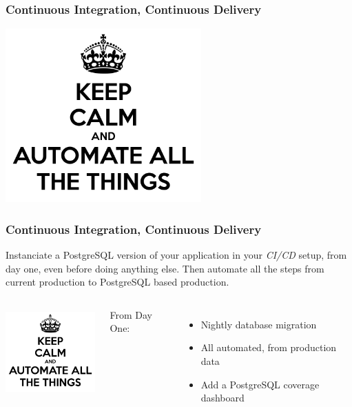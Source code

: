 \documentclass[xcolor=dvipsnames]{beamer}
\begin{document}
\begin{frame}[fragile]
  \frametitle{Continuous Integration, Continuous Delivery}

  \begin{center}
    \includegraphics[height=18em]{keep-calm-and-automate-all-the-things-13.png}
  \end{center}  
\end{frame}

\begin{frame}[fragile]
  \frametitle{Continuous Integration, Continuous Delivery}

  Instanciate a PostgreSQL version of your application in your
  \textit{CI/CD} setup, from day one, even before doing anything else. Then
  automate all the steps from current production to PostgreSQL based
  production.

  \vfill
  
  \begin{columns}[c]
    \begin{center}
      \includegraphics[height=9em]{keep-calm-and-automate-all-the-things-13.png}
    \end{center}

    From Day One:
    \begin{itemize}
    \item Nightly database migration
    \item All automated, from production data
    \item Add a PostgreSQL coverage dashboard
    \end{itemize}
  \end{columns}
\end{frame}
\end{document}
